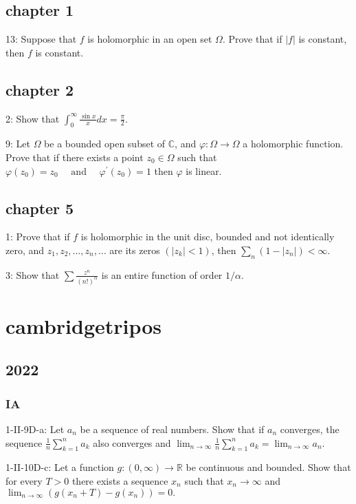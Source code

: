 \documentclass{article}
\begin{document}
\subsection*{chapter 1}
13: Suppose that $f$ is holomorphic in an open set $\Omega$. Prove that if $|f|$ is constant, then $f$ is constant. 

\subsection*{chapter 2}
2: Show that $\int_{0}^{\infty} \frac{\sin x}{x} d x=\frac{\pi}{2}$.

9: Let $\Omega$ be a bounded open subset of $\mathbb{C}$, and $\varphi: \Omega \rightarrow \Omega$ a holomorphic function. Prove that if there exists a point $z_{0} \in \Omega$ such that $\varphi\left(z_{0}\right)=z_{0} \quad \text { and } \quad \varphi^{\prime}\left(z_{0}\right)=1$ then $\varphi$ is linear.

\subsection*{chapter 5}
1: Prove that if $f$ is holomorphic in the unit disc, bounded and not identically zero, and $z_{1}, z_{2}, \ldots, z_{n}, \ldots$ are its zeros $\left(\left|z_{k}\right|<1\right)$, then $\sum_{n}\left(1-\left|z_{n}\right|\right)<\infty$. 

3: Show that $\sum \frac{z^{n}}{(n !)^{\alpha}}$ is an entire function of order $1 / \alpha$.

\section{cambridgetripos}
\subsection*{2022}
\subsubsection*{IA}
1-II-9D-a: Let $a_{n}$ be a sequence of real numbers. Show that if $a_{n}$ converges, the sequence $\frac{1}{n} \sum_{k=1}^{n} a_{k}$ also converges and $\lim _{n \rightarrow \infty} \frac{1}{n} \sum_{k=1}^{n} a_{k}=\lim _{n \rightarrow \infty} a_{n}$.

1-II-10D-c: Let a function $g:(0, \infty) \rightarrow \mathbb{R}$ be continuous and bounded. Show that for every $T>0$ there exists a sequence $x_{n}$ such that $x_{n} \rightarrow \infty$ and $\lim _{n \rightarrow \infty}\left(g\left(x_{n}+T\right)-g\left(x_{n}\right)\right)=0 .$
\end{document}
